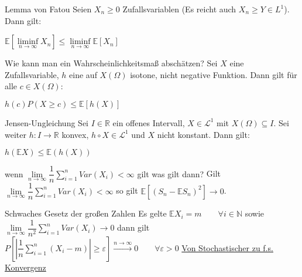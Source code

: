 \documentclass[avery5371,grid,frame]{flashcards} %
\newcommand{\1}{ \mathbb{1} } %
\begin{document}
\begin{flashcard}[Satz]{Lemma von Fatou}
  Seien $X_n\geq 0$ Zufallsvariablen (Es reicht auch $X_n \geq Y \in L^1$). Dann
  gilt:
  \begin{center}
    $\mathbb{E}[\liminf\limits_{n \to \infty} X_n]\leq
    \liminf\limits_{n \to \infty} \mathbb{E}[X_n]$
  \end{center}
\end{flashcard}

\begin{flashcard}[Satz]{Wie kann man ein Wahrscheinlichkeitsmaß abschätzen?}
  Sei $X$ eine Zufallsvariable, $h$ eine auf $X(\Omega)$ isotone, nicht negative
  Funktion. Dann gilt für alle $c \in X(\Omega)$:
  \begin{center}
    $h(c)P(X\geq c) \leq \mathbb{E}[h(X)]$
  \end{center}
\end{flashcard}

\begin{flashcard}[Satz]{Jensen-Ungleichung}
  Sei $I\in \mathbb{R}$ ein offenes Intervall, $X \in \mathcal{L}^1$
  mit $X(\Omega)\subseteq I$. Sei weiter $h:I\to\mathbb{R}$ konvex,
  $h\circ X \in \mathcal{L}^1$ und $X$ nicht konstant. Dann gilt:
  \begin{center}
    $h(\mathbb{E}X)\leq \mathbb{E}(h(X))$
  \end{center}
\end{flashcard}

\begin{flashcard}[Satz]{wenn $\lim\limits_{n \to \infty} \dfrac{1}{n}\sum\limits_{i=1}^nVar(X_i)<\infty$ gilt was gilt dann?}
  Gilt $\lim\limits_{n \to \infty} \dfrac{1}{n}\sum\limits_{i=1}^nVar(X_i)<\infty$ so gilt $\mathbb{E}[(S_n-\mathbb{E}S_n)^2]\to 0$.
\end{flashcard}

\begin{flashcard}[Satz]{Schwaches Gesetz der großen Zahlen}
  Es gelte
    $\mathbb{E}X_i=m\qquad \forall i \in \mathbb{N}$
  sowie \\
    $\lim\limits_{n \to \infty}
    \dfrac{1}{n^2}\sum\limits_{i=1}^nVar(X_i) \to 0$
  dann gilt \\
    $P\left[\left|\dfrac{1}{n}\sum\limits_{i=1}^n(X_i-m)\right|\geq
      \varepsilon\right] \overset{n \to \infty}{\to} 0 \qquad \forall
    \varepsilon >0$
  \underline{Von Stochastischer zu f.s. Konvergenz}
\end{flashcard}
\end{document}
